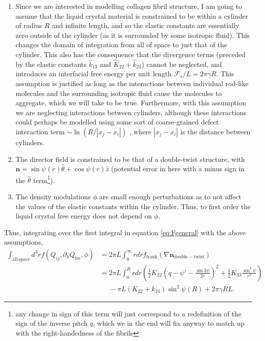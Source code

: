 \documentclass[12pt]{article}
\begin{document}
\begin{enumerate}[label=1.\alph*]
\item Since we are interested in modelling collagen fibril structure, I am going to assume that the liquid crystal material is constrained to be within a cylinder of radius $R$ and infinite length, and so the elastic constants are essentially zero outside of the cylinder (as it is surrounded by some isotropic fluid). This changes the domain of integration from all of space to just that of the cylinder. This also has the consequence that the divergence terms (preceded by the elastic constants $\hat{k}_{13}$ and $\hat{K}_{22}+\hat{k}_{24}$) cannot be neglected, and introduces an interfacial free energy per unit length $\mathcal{F}_s/L=2\pi\gamma R$. This assumption is justified as long as the interactions between individual rod-like molecules and the surrounding isotropic fluid cause the molecules to aggregate, which we will take to be true. Furthermore, with this assumption we are neglecting interactions between cylinders, although these interactions could perhaps be modelled using some sort of coarse-grained defect interaction term $\sim\ln(R/|x_j-x_i|)$ \cite{Chaikin:318158}, where $|x_j-x_i|$ is the distance between cylinders.

\item The director field is constrained to be that of a double-twist structure, with $\bm{n}=\sin\psi(r)\hat{\theta}+\cos\psi(r)\hat{z}$ (potential error in here with a minus sign in the $\hat{\theta}$ term\footnote{any change in sign of this term will just correspond to a redefinition of the sign of the inverse pitch $q$, which we in the end will fix anyway to match up with the right-handedness of the fibrils}).

\item The density modulations $\phi$ are small enough perturbations as to not affect the values of the elastic constants within the cylinder. Thus, to first order the liquid crystal free energy does not depend on $\phi$.
\end{enumerate}

Thus, integrating over the first integral in equation \ref{eq:Fgeneral} with the above assumptions,
\begin{align}
\int_{\mathrm{all\:space}}d^3rf(Q_{ij},\partial_kQ_{lm},\phi)&=2\pi L\int_0^{\infty}rdr f_{\mathrm{frank}}(\nabla\bm{n}_{\mathrm{double-twist}})\nonumber\\
&=2\pi L\int_0^{R}rdr\left(\frac{1}{2}K_{22}\left(q-\psi'-\frac{\sin2\psi}{2r}\right)^2+\frac{1}{2}K_{33}\frac{\sin^4\psi}{r^2}\right)\nonumber\\
&\phantom{=}-\pi L(K_{22}+k_{24})\sin^2\psi(R)+2\pi\gamma R L.
\end{align}
\end{document}
